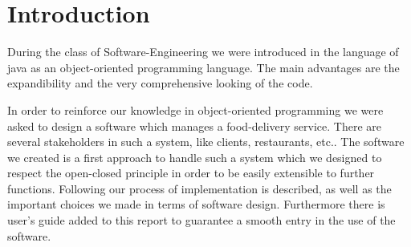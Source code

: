 \section{Introduction}
During the class of Software-Engineering we were introduced in the language of java as an object-oriented 
programming language. The main advantages are the expandibility and the very comprehensive looking of 
the code.
\par
In order to reinforce our knowledge in object-oriented programming we were asked to design a software
which manages a food-delivery service. There are several stakeholders in such a system, like clients, 
restaurants, etc.. The software we created is a first approach to handle such a system which we
designed to respect the open-closed principle in order to be easily extensible to further functions.
Following our process of implementation is described, as well as the important choices we made in 
terms of software design. Furthermore there is user's guide added to this report to guarantee a smooth
entry in the use of the software.
